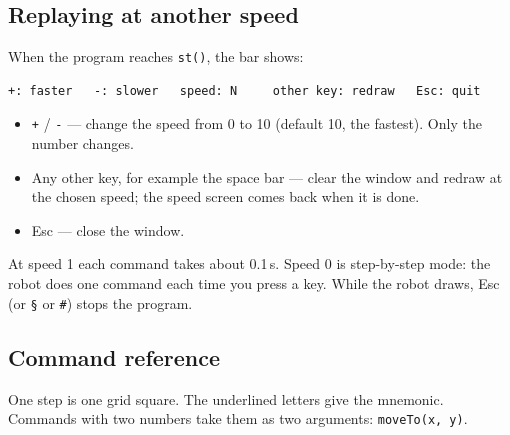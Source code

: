 \documentclass[11pt,a4paper]{article}
\newcommand{\kbd}[1]{\texttt{#1}}
\begin{document}
\subsection{Replaying at another speed}\label{sec:replay}
When the program reaches \kbd{st()}, the bar shows:
\begin{lstlisting}
+: faster   -: slower   speed: N     other key: redraw   Esc: quit
\end{lstlisting}
\begin{itemize}
\item \kbd{+} / \kbd{-} --- change the speed from 0 to 10 (default 10, the
  fastest). Only the number changes.
\item Any other key, for example the space bar --- clear the window and
  redraw at the chosen speed; the speed screen comes back when it is done.
\item Esc --- close the window.
\end{itemize}
At speed 1 each command takes about 0.1\,s. Speed 0 is step-by-step mode:
the robot does one command each time you press a key. While the robot
draws, Esc (or \kbd{\S} or \kbd{\#}) stops the program.

\subsection{Command reference}
One step is one grid square. The underlined letters give the mnemonic.
Commands with two numbers take them as two arguments: \kbd{moveTo(x, y)}.
\end{document}
